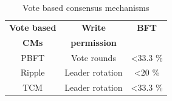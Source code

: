 \begin{table}
	\centering
	\begin{tabularx}{0.55\textwidth}{ c | c | c }
		\textbf{Vote based} & \textbf{Write} & \textbf{\gls{BFT}} \\
		\textbf{\gls{CM}s} & \textbf{permission} & \\ \hline \hline
		\gls{PBFT} & Vote rounds  & \textless $33.3$ \% \\ \hline
		\gls{Ripple} & Leader rotation & \textless $20$ \%  \\ \hline
		\gls{TCM} & Leader rotation & \textless $33.3$ \%  \\ \hline
		\hline
	\end{tabularx}
	\caption{Vote based consensus mechanisms \cite[5]{Khan.2020}}
	\label{tbl:SumConsensusMechanisms_2}
\end{table}

